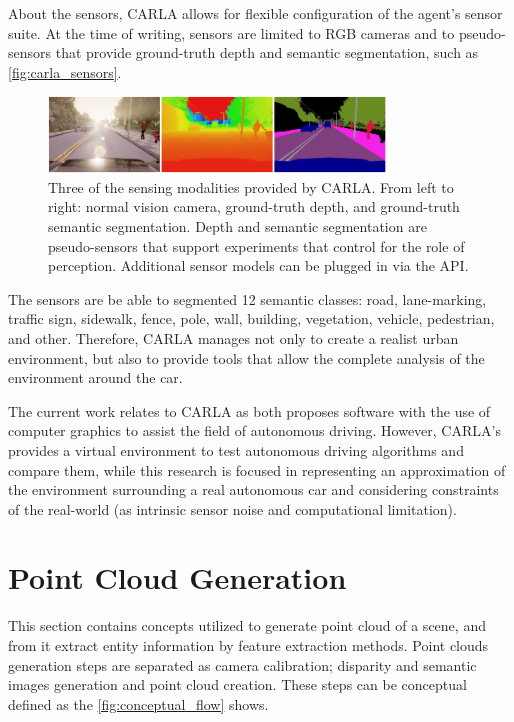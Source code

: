     About the sensors, CARLA allows for flexible configuration of the agent’s sensor suite. At the time of writing, sensors are limited to RGB cameras and to pseudo-sensors that provide ground-truth depth and semantic segmentation, such as \autoref{fig:carla_sensors}.
    
     \begin{figure}[H]
     \caption{\label{fig:carla_sensors}
Three of the sensing modalities provided by CARLA. From left to right: normal vision camera, ground-truth depth, and ground-truth semantic segmentation. Depth and semantic segmentation are pseudo-sensors that support experiments that control for the role of perception. Additional sensor models can be plugged in via the API.}
     \begin{center}
        \includegraphics[width=0.8\textwidth]{images/sensor_carla.png}
     \end{center}
    \end{figure} 

    The sensors are be able to segmented 12 semantic classes: road, lane-marking, traffic sign, sidewalk, fence, pole, wall, building, vegetation, vehicle, pedestrian, and other. Therefore, CARLA manages not only to create a realist urban environment, but also to provide tools that allow the complete analysis of the environment around the car.
    
    The current work relates to CARLA as both proposes software with the use of computer graphics to assist the field of autonomous driving. However, CARLA's provides a virtual environment to test autonomous driving algorithms and compare them, while this research is focused in representing an approximation of the environment surrounding a real autonomous car and considering constraints of the real-world (as intrinsic sensor noise and computational limitation).

\section{Point Cloud Generation}

    This section contains concepts utilized to generate point cloud of a scene, and from it extract entity information by feature extraction methods. Point clouds generation steps are separated as camera calibration; disparity and semantic images generation and point cloud creation. These steps can be conceptual defined as the \autoref{fig:conceptual_flow} shows. 
    
